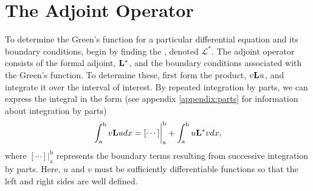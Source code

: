 \section{The Adjoint Operator}
To determine the Green's function for a particular differential equation and its boundary conditions, begin by finding the , denoted \(\mathcal{L}^*\). The adjoint operator consists of the formal adjoint, \(\mathrm{\bf{L^*}}  \), and the boundary conditions associated with the Green's function. To determine these, first form the product, \(v\mathrm{\bf{L}} u\), and integrate it over the interval of interest. By repeated integration by parts, we can express the integral in the form (see appendix \ref{appendix:parts} for information about integration by parts)
\begin{equation} \label{eq:adjoint}
	\int_\mathrm{a}^\mathrm{b} v \mathrm{\bf{L}} u dx = [\cdots]\biggr\rvert_\mathrm{a}^\mathrm{b} + \int_\mathrm{a}^\mathrm{b} u\mathrm{\bf{L^*}}  v dx,
\end{equation}
where \([\cdots]\biggr\rvert_\mathrm{a}^\mathrm{b}\) represents the boundary terms resulting from successive integration by parts. Here, \(u\) and \(v\) must be sufficiently differentiable functions so that the left and right sides are well defined. 

